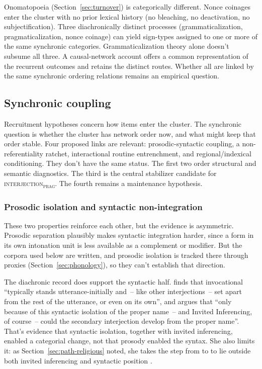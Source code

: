 \documentclass[12pt]{article}
\newcommand{\intj}[1]{\textsc{interjection\textsubscript{#1}}}
\begin{document}
Onomatopoeia (Section~\ref{sec:turnover}) is categorically different.
Nonce coinages enter the cluster with no prior lexical history (no bleaching, no
deactivation, no subjectification). Three diachronically distinct
processes (grammaticalization, pragmaticalization, nonce coinage)
can yield sign-types assigned to one or more of the same synchronic
categories. Grammaticalization theory alone doesn't subsume all three. A
causal-network account offers a common representation of the recurrent
outcomes and retains the distinct routes. Whether all are linked by the
same synchronic ordering relations remains an empirical question.

\subsection{Synchronic coupling}\label{sec:synchronic-coupling}

Recruitment hypotheses concern how items enter the cluster. The synchronic
question is whether the cluster has network order now, and what might keep
that order stable. Four proposed links are relevant:
prosodic-syntactic coupling, a non-referentiality ratchet,
interactional routine entrenchment, and regional/indexical conditioning.
They don't have the same status. The first two order structural
and semantic diagnostics. The third is the central stabilizer candidate
for \intj{prag}. The fourth remains a
maintenance hypothesis.

\subsubsection{Prosodic isolation and syntactic non-integration}

These two properties reinforce each other, but the evidence is asymmetric.
Prosodic separation plausibly makes
syntactic integration harder, since a form in its own intonation unit is less
available as a complement or modifier. But the corpora used below are
written, and prosodic isolation is tracked there through proxies
(Section~\ref{sec:phonology}), so they can't establish that direction.

The diachronic record does support the syntactic half.
\textcite[85]{gehweiler2008} finds that invocational 
\enquote{typically stands utterance-initially and~-- like other
interjections~-- set apart from the rest of the utterance, or even on its
own}, and argues that \enquote{only because of this syntactic isolation of
the proper name~-- and Invited Inferencing, of course~-- could the secondary
interjection  develop from the proper name}. That's
evidence that syntactic isolation, together with invited inferencing, enabled
a categorial change, not that prosody enabled the syntax. She also limits it: as Section~\ref{sec:path-religious} noted, she takes the
step from  to  to lie outside both invited
inferencing and syntactic position \citep[88]{gehweiler2008}.
\end{document}
